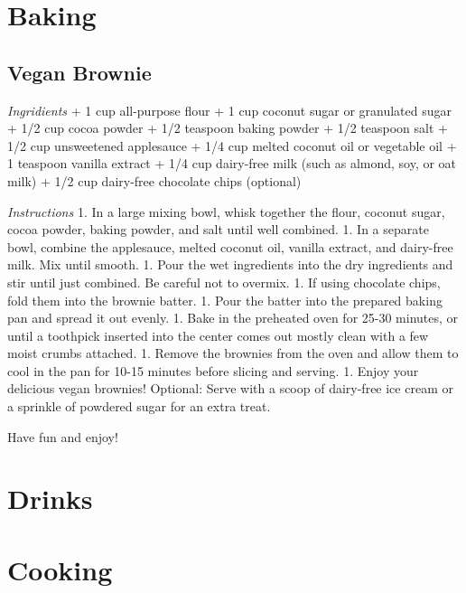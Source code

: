 \documentclass[
  letterpaper,
  DIV=11,
  numbers=noendperiod]{scrartcl}
\begin{document}
\section{Baking}\label{baking}

\subsection{Vegan Brownie}\label{vegan-brownie}

\emph{Ingridients} + 1 cup all-purpose flour + 1 cup coconut sugar or
granulated sugar + 1/2 cup cocoa powder + 1/2 teaspoon baking powder +
1/2 teaspoon salt + 1/2 cup unsweetened applesauce + 1/4 cup melted
coconut oil or vegetable oil + 1 teaspoon vanilla extract + 1/4 cup
dairy-free milk (such as almond, soy, or oat milk) + 1/2 cup dairy-free
chocolate chips (optional)

\emph{Instructions} 1. In a large mixing bowl, whisk together the flour,
coconut sugar, cocoa powder, baking powder, and salt until well
combined. 1. In a separate bowl, combine the applesauce, melted coconut
oil, vanilla extract, and dairy-free milk. Mix until smooth. 1. Pour the
wet ingredients into the dry ingredients and stir until just combined.
Be careful not to overmix. 1. If using chocolate chips, fold them into
the brownie batter. 1. Pour the batter into the prepared baking pan and
spread it out evenly. 1. Bake in the preheated oven for 25-30 minutes,
or until a toothpick inserted into the center comes out mostly clean
with a few moist crumbs attached. 1. Remove the brownies from the oven
and allow them to cool in the pan for 10-15 minutes before slicing and
serving. 1. Enjoy your delicious vegan brownies! Optional: Serve with a
scoop of dairy-free ice cream or a sprinkle of powdered sugar for an
extra treat.

Have fun and enjoy!

\section{Drinks}\label{drinks}

\section{Cooking}\label{cooking}
\end{document}
